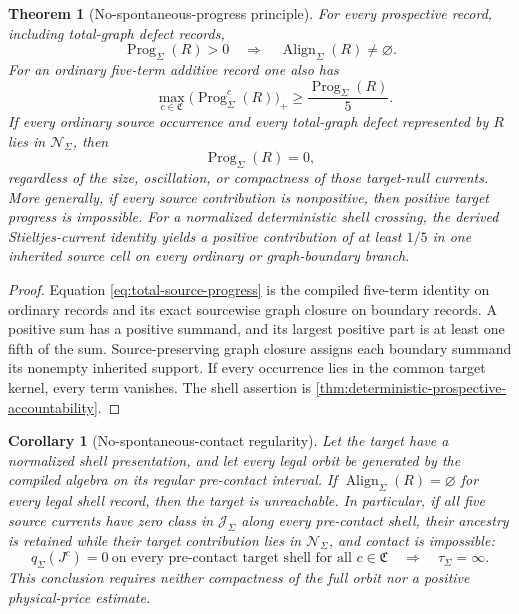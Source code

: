 \documentclass[11pt]{article}
\numberwithin{section}{part}
\theoremstyle{plain}
\newtheorem{theorem}{Theorem}[section]
\newtheorem{corollary}[corollary]{Corollary}
\theoremstyle{definition}
\theoremstyle{remark}
\newcommand{\Channels}{\mathfrak C}
\newcommand{\Align}{\operatorname{Align}}
\newcommand{\Null}{\mathscr N}
\begin{document}
\begin{theorem}[No-spontaneous-progress principle]
\label{thm:target-alignment-necessity}
For every prospective record, including total-graph defect records,
\begin{equation}
 \label{eq:positive-progress-needs-alignment}
 \operatorname{Prog}_\Sigma(R)>0
 \quad\Longrightarrow\quad
 \Align_\Sigma(R)\ne\varnothing.
\end{equation}
For an ordinary five-term additive record one also has
\begin{equation}
 \label{eq:ordinary-five-term-margin}
 \qquad
 \max_{c\in\Channels}
   \bigl(\operatorname{Prog}_\Sigma^c(R)\bigr)_+
 \ge \frac{\operatorname{Prog}_\Sigma(R)}5.
\end{equation}
If every ordinary source occurrence and every total-graph defect represented by \(R\) lies in
\(\Null_\Sigma\), then
\begin{equation}
 \label{eq:null-structure-zero-progress}
 \operatorname{Prog}_\Sigma(R)=0,
\end{equation}
regardless of the size, oscillation, or compactness of those target-null
currents.  More generally, if every source contribution is nonpositive, then
positive target progress is impossible.  For a normalized deterministic shell
crossing, the derived Stieltjes-current identity yields a positive
contribution of at least \(1/5\) in one inherited source cell on every
ordinary or graph-boundary branch.
\end{theorem}

\begin{proof}
Equation \eqref{eq:total-source-progress} is the compiled five-term identity
on ordinary records and its exact sourcewise graph closure on boundary
records.  A positive sum has a positive summand, and its largest positive part
is at least one fifth of the sum.  Source-preserving graph closure assigns
each boundary summand its nonempty inherited support.  If every occurrence
lies in the common target kernel, every term vanishes.  The shell assertion is
\cref{thm:deterministic-prospective-accountability}.
\end{proof}

\begin{corollary}[No-spontaneous-contact regularity]
\label{cor:target-avoidance-regularity}
Let the target have a normalized shell presentation, and let every legal
orbit be generated by the compiled algebra on its regular pre-contact interval.  If
\(\Align_\Sigma(R)=\varnothing\) for every legal shell record, then the target
is unreachable.  In particular, if all five source currents have zero class
in \(\mathscr J_\Sigma\) along every pre-contact shell, their ancestry is
retained while their target contribution lies in \(\Null_\Sigma\), and contact is
impossible:
\begin{equation}
 \label{eq:null-current-direct-regularity}
 \boxed{
 q_\Sigma(J^c)=0
 \ \text{on every pre-contact target shell for all }c\in\Channels
 \quad\Longrightarrow\quad
 \tau_\Sigma=\infty.}
\end{equation}
This conclusion requires neither compactness of the full orbit nor a positive
physical-price estimate.
\end{corollary}
\end{document}
